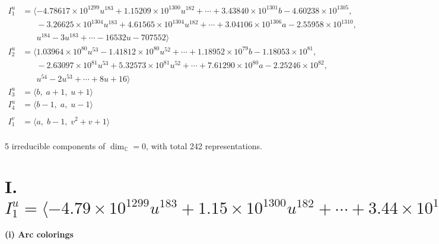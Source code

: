 \documentclass[1p]{elsarticle_modified}
\theoremstyle{definition}
\begin{document}
\begin{align*}
I^u_{1}&=\langle 
-4.78617\times10^{1299} u^{183}+1.15209\times10^{1300} u^{182}+\cdots+3.43840\times10^{1301} b-4.60238\times10^{1305},\\
\phantom{I^u_{1}}&\phantom{= \langle  }-3.26625\times10^{1304} u^{183}+4.61565\times10^{1304} u^{182}+\cdots+3.04106\times10^{1306} a-2.55958\times10^{1310},\\
\phantom{I^u_{1}}&\phantom{= \langle  }u^{184}-3 u^{183}+\cdots-16532 u-707552\rangle \\
I^u_{2}&=\langle 
1.03964\times10^{80} u^{53}-1.41812\times10^{80} u^{52}+\cdots+1.18952\times10^{79} b-1.18053\times10^{81},\\
\phantom{I^u_{2}}&\phantom{= \langle  }-2.63097\times10^{81} u^{53}+5.32573\times10^{81} u^{52}+\cdots+7.61290\times10^{80} a-2.25246\times10^{82},\\
\phantom{I^u_{2}}&\phantom{= \langle  }u^{54}-2 u^{53}+\cdots+8 u+16\rangle \\
I^u_{3}&=\langle 
b,\;a+1,\;u+1\rangle \\
I^u_{4}&=\langle 
b-1,\;a,\;u-1\rangle \\
\\
I^v_{1}&=\langle 
a,\;b-1,\;v^2+v+1\rangle \\
\end{align*}
\raggedright * 5 irreducible components of $\dim_{\mathbb{C}}=0$, with total 242 representations.\\
\newpage
\renewcommand{\arraystretch}{1}
\centering \section*{I. $I^u_{1}= \langle -4.79\times10^{1299} u^{183}+1.15\times10^{1300} u^{182}+\cdots+3.44\times10^{1301} b-4.60\times10^{1305},\;-3.27\times10^{1304} u^{183}+4.62\times10^{1304} u^{182}+\cdots+3.04\times10^{1306} a-2.56\times10^{1310},\;u^{184}-3 u^{183}+\cdots-16532 u-707552 \rangle$}
\flushleft \textbf{(i) Arc colorings}\\
\end{document}
